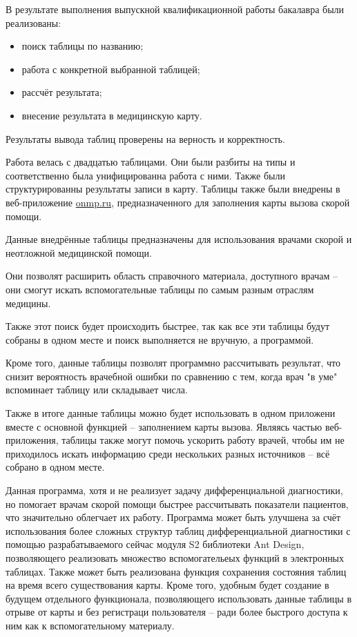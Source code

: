 \conclusion

В результате выполнения выпускной квалификационной работы бакалавра были реализованы:

\begin{itemize}
    \item поиск таблицы по названию;
    \item работа с конкретной выбранной таблицей;
    \item рассчёт результата;
    \item внесение результата в медицинскую карту.
\end{itemize}

Результаты вывода таблиц проверены на верность и корректность.

Работа велась с двадцатью таблицами. Они были разбиты на типы и соответственно была унифицированна работа с ними. Также были структурированны результаты записи в карту. Таблицы также были внедрены в веб-приложение \url{onmp.ru}, предназначенного для заполнения карты вызова скорой помощи.

Данные внедрённые таблицы предназначены для использования врачами скорой и неотложной медицинской помощи.

Они позволят расширить область справочного материала, доступного врачам -- они смогут искать вспомогательные таблицы по самым разным отраслям медицины.  

Также этот поиск будет происходить быстрее, так как все эти таблицы будут собраны в одном месте и поиск выполняется не вручную, а программой. 

Кроме того, данные таблицы позволят программно рассчитывать результат, что снизит вероятность врачебной ошибки по сравнению с тем, когда врач "в уме" вспоминает таблицу или складывает числа.

Также в итоге данные таблицы можно будет использовать в одном приложени вместе с основной функцией -- заполнением карты вызова. Являясь частью веб-приложения, таблицы также могут помочь ускорить работу врачей, чтобы им не приходилось искать информацию среди нескольких разных источников -- всё собрано в одном месте.

Данная программа, хотя и не реализует задачу дифференциальной диагностики, но помогает врачам скорой помощи быстрее рассчитывать показатели пациентов, что значительно облегчает их работу. Программа может быть улучшена за счёт использования более сложных структур таблиц дифференциальной диагностики с помощью разрабатываемого сейчас модуля S2 библиотеки Ant Design, позволяющего реализовать множество вспомогательеых функций в электронных таблицах. Также может быть реализована функция сохранения состояния таблиц на время всего существования карты. Кроме того, удобным будет создание в будущем отдельного функционала, позволяющего использовать данные таблицы в отрыве от карты и без регистраци пользователя -- ради более быстрого доступа к ним как к вспомогательному материалу.